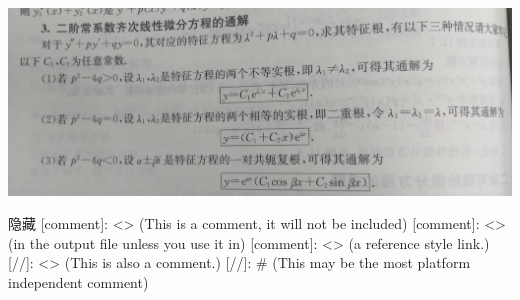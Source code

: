 \documentclass[11pt]{article}
\makeatletter
\def\maxwidth{\ifdim\Gin@nat@width>\linewidth\linewidth
    \else\Gin@nat@width\fi}
\let\Oldincludegraphics\includegraphics
\renewcommand{\includegraphics}[1]{\Oldincludegraphics[width=.8\maxwidth]{#1}}
\makeatother
\begin{document}
\begin{enumerate}
  \includegraphics{9345E7/601054614.jpg}
\end{enumerate}

    隐藏 {[}comment{]}: \textless{}\textgreater{} (This is a comment, it
will not be included) {[}comment{]}: \textless{}\textgreater{} (in the
output file unless you use it in) {[}comment{]}:
\textless{}\textgreater{} (a reference style link.) {[}//{]}:
\textless{}\textgreater{} (This is also a comment.) {[}//{]}: \# (This
may be the most platform independent comment)


    
    
    
    
\end{document}
